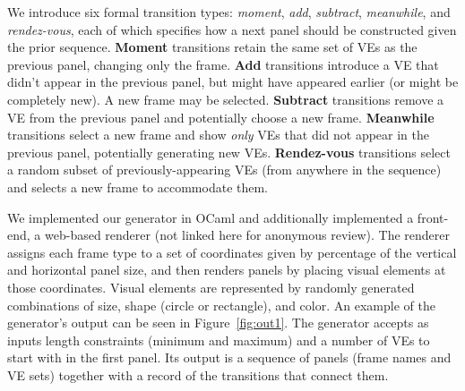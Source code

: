 
We introduce six formal transition types: {\em moment}, {\em add}, {\em
subtract}, {\em meanwhile}, and {\em rendez-vous}, each of which specifies
how a next panel should be constructed given the prior sequence.
{\bf Moment} transitions retain the same set of VEs as the previous panel, 
changing only the frame.
{\bf Add} transitions introduce a VE that didn't appear in the
previous panel, but might have appeared earlier (or might be completely
new). A new frame may be selected.
{\bf Subtract} transitions remove a VE from the previous panel and
potentially choose a new frame.
{\bf Meanwhile} transitions select a new frame and show {\em only}
VEs that did not appear in the previous panel, potentially generating new
VEs.
{\bf Rendez-vous} transitions select a random subset of
previously-appearing VEs (from anywhere in the sequence) and selects a new
frame to accommodate them.




We implemented our generator in OCaml and additionally implemented a
front-end, a web-based renderer (not linked here for anonymous review). The
renderer assigns each frame type to a set of coordinates given by
percentage of the vertical and horizontal panel size, and then renders
panels by placing visual elements at those coordinates. Visual elements are
represented by randomly generated combinations of size, shape (circle or
rectangle), and color.  An example of the generator's output can be seen in
Figure~\ref{fig:out1}. 
The generator accepts as inputs length constraints (minimum and maximum)
and a number of VEs to start with in the first panel. Its output is a
sequence of panels (frame names and VE sets) together with a record of the
transitions that connect them.
% 

